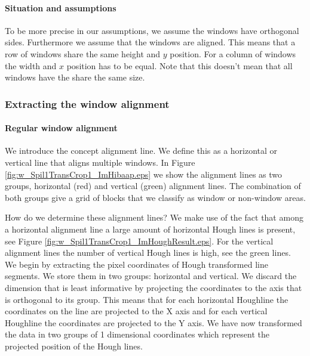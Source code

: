 \paragraph{Situation and assumptions}
To be more precise in our assumptions, we assume the windows have orthogonal
sides.  Furthermore we assume that the windows are aligned. This means that a
row of windows share the same height and $y$ position. For a column of windows
the width and $x$ position has to be equal.  Note that this doesn't mean that
all windows have the share the same size.



\subsubsection{Extracting the window alignment}
\paragraph{Regular window alignment}
We introduce the concept alignment line. We define this as a horizontal or
vertical line that aligns multiple windows. In Figure
\ref{fig:w_Spil1TransCrop1_ImHibaap.eps}
we show the alignment lines as two groups, horizontal (red) and
vertical (green) alignment lines.  The combination of both groups give a grid of
blocks that we classify as window or non-window areas.\\



How do we determine these alignment lines? We make use of the fact that among a
horizontal alignment line a large amount of horizontal Hough lines is present, see
Figure \ref{fig:w_Spil1TransCrop1_ImHoughResult.eps}. For the vertical alignment lines
the number of vertical Hough lines is high, see the green lines.\\

We begin by extracting the pixel coordinates of Hough transformed line
segments. We store them in two groups: horizontal and vertical. %
We discard the dimension that is least informative by projecting the coordinates to
the axis that is orthogonal to its group. 
This means that for each horizontal Houghline the coordinates on the line are projected to the X
axis and for each vertical Houghline the coordinates are projected to the Y
axis. We have now transformed the data in two groups of 1 dimensional
coordinates which represent the projected position of the Hough lines.\\

